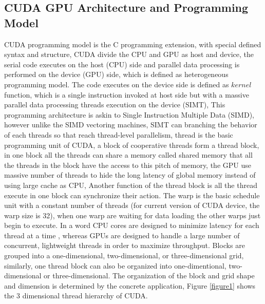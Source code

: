 \documentclass[12pt,a4paper,final]{article}
\begin{document}
\begin{spacing}{2.5}
\section{CUDA GPU Architecture and  Programming Model} \label{programming model}
  CUDA programming model is the C programming extension, with special defined syntax and structure, CUDA divide the CPU and GPU as host and device, the serial code executes on the host (CPU) side and parallel data processing is performed on the device (GPU) side, which is defined as heterogeneous programming model. The code executes on the device side is defined as $\mathit{kernel}$ function, which is a single instruction invoked at host side but with a massive parallel data processing threads execution on the device (SIMT), This programming architecture is askin to Single Instruction Multiple Data (SIMD), however unlike the SIMD vectoring machines, SIMT can branching the behavior of each threads so that reach thread-level parallelism, thread is the basic programming unit of CUDA, a block of cooperative threads form a thread block, in one block all the threads can share a memory called shared memory that all the threads in the block have the access to this pitch of memory, the GPU use massive number of threads to hide the long latency of global memory instead of using large cache as CPU, Another function of the thread block is all the thread execute in one block can synchronize their action. The warp is the basic schedule unit with a constant number of threads  (for current version of CUDA device, the warp size is 32), when one warp are waiting for data loading the other warps just begin to execute. In a word CPU cores are designed to minimize latency for each thread at a time , whereas GPUs are designed to handle a large number of concurrent, lightweight threads in order to maximize throughput. Blocks are grouped into a one-dimensional, two-dimensional, or three-dimensional grid, similarly, one thread block can also be organized into one-dimentional, two-dimensional or three-dimensional. The organization of the block and grid shape and dimension is determined by the concrete application, Figure \ref{figure1} shows the 3 dimensional thread hierarchy of CUDA.
\begin{figure}[htb]
\centering

\end{figure}
\end{spacing}
\end{document}
